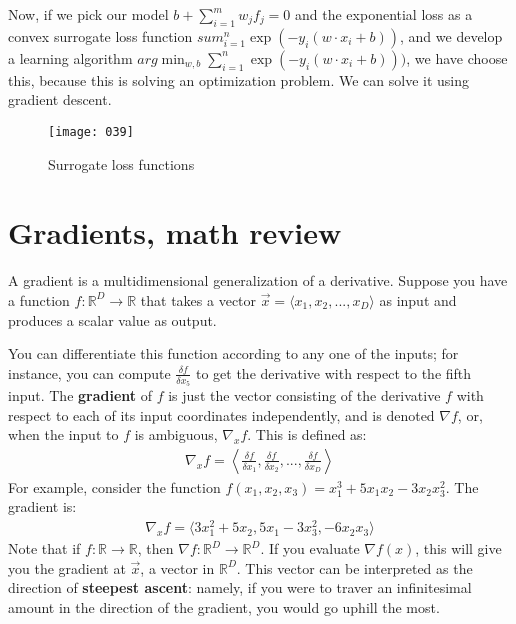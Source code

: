 Now, if we pick our model \(b + \sum_{i=1}^m w_j f_j = 0\) and the exponential loss as a convex surrogate loss function \(sum_{i=1}^n \exp(-y_i (w \cdot x_i + b))\), and we develop a learning algorithm \(arg \min_{w,b} \sum_{i=1}^n \exp(-y_i (w \cdot x_i + b)))\), we have choose this, because this is solving an optimization problem. We can solve it using gradient descent.

\begin{figure}[t]
\begin{center}
    \texttt{[image: 039]}
    \vspace*{-25pt}
\end{center}
\caption{Surrogate loss functions}
\label{fig:039}
\end{figure}

\section{Gradients, math review}
A gradient is a multidimensional generalization of a derivative. Suppose you have a function \(f : \mathbb{R}^D \to \mathbb{R}\) that takes a vector \(\vec{x} = \langle x_1, x_2, ..., x_D \rangle \) as input and produces a scalar value as output.

You can differentiate this function according to any one of the inputs; for instance, you can compute \(\frac {\delta f} {\delta x_5}\) to get the derivative with respect to the fifth input. The \textbf{gradient} of \(f\) is just the vector consisting of the derivative \(f\) with respect to each of its input coordinates independently, and is denoted \(\nabla f\), or, when the input to \(f\) is ambiguous, \(\nabla_x f\). This is defined as:
\begin{align}
    \nabla_x f = \left\langle \frac{\delta f}{\delta x_1}, \frac{\delta f}{\delta x_2}, ..., \frac{\delta f}{\delta x_D} \right\rangle
\end{align}
For example, consider the function \(f(x_1,x_2,x_3) = x_1^3+5x_1x_2-3x_2x_3^2\). The gradient is:
\begin{align}
    \nabla_x f = \langle 3x_1^2 + 5x_2, 5x_1-3x_3^2, -6x_2x_3 \rangle
\end{align}
Note that if \(f : \mathbb{R} \to \mathbb{R}\), then \(\nabla f : \mathbb{R}^D \to \mathbb{R}^D\). If you evaluate \(\nabla f(x)\), this will give you the gradient at \(\vec{x}\), a vector in \(\mathbb{R}^D\). This vector can be interpreted as the direction of \textbf{steepest ascent}: namely, if you were to traver an infinitesimal amount in the direction of the gradient, you would go uphill the most.

